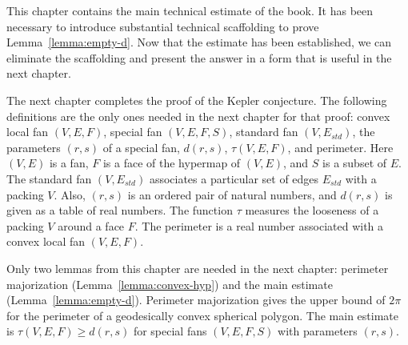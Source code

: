 This chapter contains the main technical estimate of the book.  It
has been necessary to introduce substantial technical scaffolding to
prove Lemma~\ref{lemma:empty-d}.  Now that the estimate has been established, we
can eliminate the scaffolding and present the answer in a form that
is useful in the next chapter.

The next chapter  completes the proof of the Kepler conjecture.
The following definitions are the only ones needed in the next chapter
for that proof: convex local fan $(V,E,F)$, special fan $(V,E,F,S)$,
standard fan $(V,E_{std})$, the parameters $(r,s)$ of a special fan,
$d(r,s)$, $\tau(V,E,F)$, and perimeter.  Here $(V,E)$ is a fan, $F$ is
a face of the hypermap of $(V,E)$, and $S$ is a subset of $E$.  The
standard fan $(V,E_{std})$ associates a particular set of edges
$E_{std}$ with a packing $V$.  Also, $(r,s)$ is an ordered pair of
natural numbers, and $d(r,s)$ is given as a table of real numbers.
The function $\tau$ measures the looseness of a packing $V$ around a
face $F$.  The perimeter is a real number associated with a convex
local fan $(V,E,F)$.

Only two lemmas from this chapter are needed in the next chapter:
perimeter majorization (Lemma~\ref{lemma:convex-hyp}) and the main
estimate (Lemma~\ref{lemma:empty-d}).  Perimeter majorization gives
the upper bound of $2\pi$ for the perimeter of a geodesically convex
spherical polygon.  The main estimate is $\tau(V,E,F)\ge d(r,s)$ for
special fans $(V,E,F,S)$ with parameters $(r,s)$.
